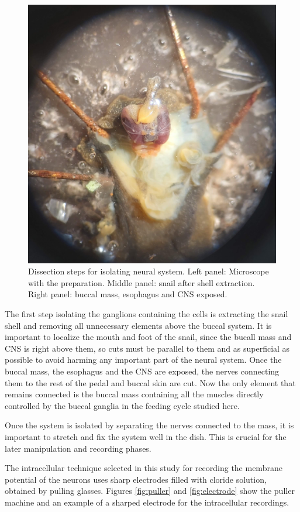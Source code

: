 \begin{figure}[htb!]
	\includegraphics[width=0.8\linewidth]{img/methods/preparation/buccal_mass_ganglias.jpg}
	\endminipage\qquad
	\caption{Dissection steps for isolating neural system. Left panel: Microscope with the preparation. Middle panel: snail after shell extraction. Right panel: buccal mass, esophagus and CNS exposed.}
	\label{fig:preparation}
\end{figure}

The first step isolating the ganglions containing the cells is extracting the snail shell and removing all unnecessary elements above the buccal system. It is important to localize the mouth and foot of the snail, since the bucall mass and CNS is right above them, so cuts must be parallel to them and as superficial as possible to avoid harming any important part of the neural system. Once the buccal mass, the esophagus and the CNS are exposed, the nerves connecting them to the rest of the pedal and buccal skin are cut. Now the only element that remains connected is the buccal mass containing all the muscles directly controlled by the buccal ganglia in the feeding cycle studied here.

Once the system is isolated by separating the nerves connected to the mass, it is important to stretch and fix the system well in the dish. This is crucial for the later manipulation and recording phases. 

The intracellular technique selected in this study for recording the membrane potential of the neurons uses sharp electrodes filled with cloride solution, obtained by pulling glasses. Figures \ref{fig:puller} and \ref{fig:electrode} show the puller machine and an example of a sharped electrode for the intracellular recordings. 

